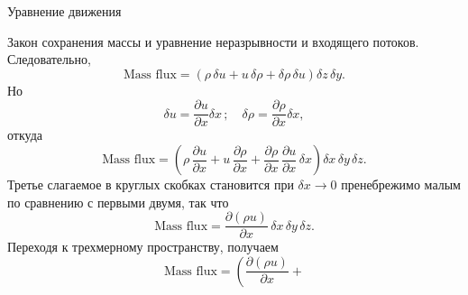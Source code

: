 \begin{chapter}{Уравнение движения}
\begin{section}{Закон сохранения массы и уравнение неразрывности}
и входящего потоков. Следовательно,
%
%
\begin{equation*}
 \text{Mass flux} = ( \rho \, \delta u + u \, \delta \rho + \delta \rho \, \delta u)  \delta z \,  \delta y.
\end{equation*}
%
%
Но
\begin{equation*}
 \delta u = \frac{\partial u}{\partial x} \delta x \,;\quad \delta \rho = \frac{\partial {\rho}}{\partial x} \delta x,
\end{equation*}
%
%
откуда
%
\begin{equation*}
\text{Mass flux} = \left(\rho \, \frac{\partial{u}}{\partial{x}} 
 + u\,\frac{\partial{\rho}}{\partial{x}} 
 +\frac{\partial{\rho}}{\partial{x}}\,\frac{\partial{u}}{\partial{x}}\,\delta{x}\right)
  \delta{x}\,\delta{y}\,\delta{z}.
\end{equation*}
%
Третье слагаемое в круглых скобках становится при $\delta x \rightarrow 0$
пренебрежимо малым по сравнению с первыми двумя, так что
\begin{equation*}
 \text{Mass flux} =
 \frac{\partial{(\rho{u})}}{\partial{x}}\,\delta{x}\,\delta{y}\,\delta{z}.
\end{equation*}
%
%
Переходя к трехмерному пространству, получаем
\begin{displaymath}
\mbox{Mass flux} = \left(\frac{\partial{(\rho{u})}}{\partial{x}} +

\end{displaymath}
\end{section}
\end{chapter}
